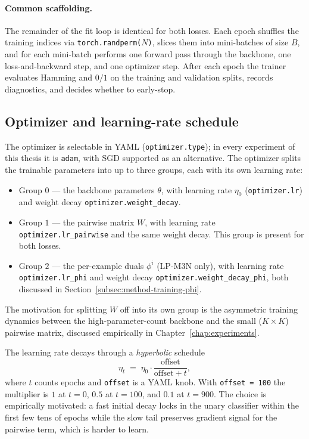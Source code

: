 \paragraph{Common scaffolding.}
The remainder of the fit loop is identical for both losses.
Each epoch shuffles the training indices via
\texttt{torch.randperm($N$)}, slices them into mini-batches of
size $B$, and for each mini-batch performs one forward pass
through the backbone, one loss-and-backward step, and one
optimizer step. After each epoch the trainer evaluates Hamming
and $0/1$ on the training and validation splits, records
diagnostics, and decides whether to early-stop.

\subsection{Optimizer and learning-rate schedule}
\label{subsec:method-training-optimizer}

The optimizer is selectable in YAML (\texttt{optimizer.type});
in every experiment of this thesis it is \texttt{adam}, with
SGD supported as an alternative. The optimizer splits the
trainable parameters into up to three groups, each with its own
learning rate:
\begin{itemize}
    \item Group $0$ --- the backbone parameters $\theta$, with
    learning rate $\eta_{0}$ (\texttt{optimizer.lr}) and weight
    decay \texttt{optimizer.weight\_decay}.
    \item Group $1$ --- the pairwise matrix $W$, with learning
    rate \texttt{optimizer.lr\_pairwise} and the same weight
    decay. This group is present for both losses.
    \item Group $2$ --- the per-example duals $\phi^{i}$
    (LP-M3N only), with learning rate \texttt{optimizer.lr\_phi}
    and weight decay \texttt{optimizer.weight\_decay\_phi}, both
    discussed in Section~\ref{subsec:method-training-phi}.
\end{itemize}
The motivation for splitting $W$ off into its own group is the
asymmetric training dynamics between the high-parameter-count
backbone and the small ($K \times K$) pairwise matrix, discussed
empirically in Chapter~\ref{chap:experiments}.

The learning rate decays through a \emph{hyperbolic} schedule
\begin{equation}
    \eta_{t} \;=\; \eta_{0} \cdot
    \frac{\mathrm{offset}}{\mathrm{offset} + t},
    \label{eq:method-lambda-schedule}
\end{equation}
where $t$ counts epochs and \texttt{offset} is a YAML knob.
With \texttt{offset = 100} the multiplier is $1$ at $t = 0$,
$0.5$ at $t = 100$, and $0.1$ at $t = 900$. The choice is
empirically motivated: a fast initial decay locks in the
unary classifier within the first few tens of epochs while the
slow tail preserves gradient signal for the pairwise term,
which is harder to learn.

